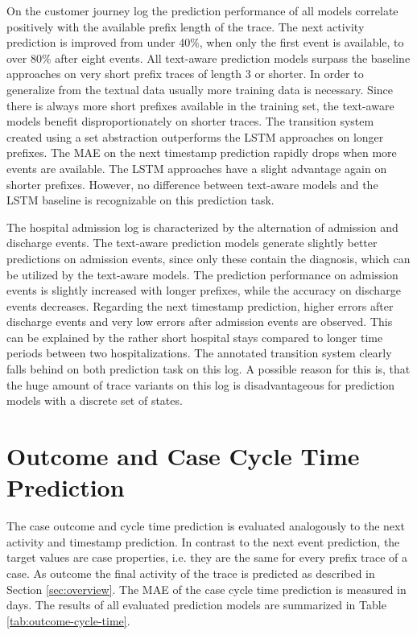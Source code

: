 On the customer journey log the prediction performance of all models correlate positively with the available prefix length of the trace.
The next activity prediction is improved from under 40\%, when only the first event is available, to over 80\% after eight events.
All text-aware prediction models surpass the baseline approaches on very short prefix traces of length 3 or shorter.
In order to generalize from the textual data usually more training data is necessary.
Since there is always more short prefixes available in the training set, the text-aware models benefit disproportionately on shorter traces.
The transition system created using a set abstraction outperforms the LSTM approaches on longer prefixes.
The MAE on the next timestamp prediction rapidly drops when more events are available.
The LSTM approaches have a slight advantage again on shorter prefixes.
However, no difference between text-aware models and the LSTM baseline is recognizable on this prediction task.

The hospital admission log is characterized by the alternation of admission and discharge events.
The text-aware prediction models generate slightly better predictions on admission events, since only these contain the diagnosis, which can be utilized by the text-aware models.
The prediction performance on admission events is slightly increased with longer prefixes, while the accuracy on discharge events decreases.
Regarding the next timestamp prediction, higher errors after discharge events and very low errors after admission events are observed.
This can be explained by the rather short hospital stays compared to longer time periods between two hospitalizations.
The annotated transition system clearly falls behind on both prediction task on this log.
A possible reason for this is, that the huge amount of trace variants on this log is disadvantageous for prediction models with a discrete set of states.


\section{Outcome and Case Cycle Time Prediction}

The case outcome and cycle time prediction is evaluated analogously to the next activity and timestamp prediction.
In contrast to the next event prediction, the target values are case properties, i.e. they are the same for every prefix trace of a case.
As outcome the final activity of the trace is predicted as described in Section \ref{sec:overview}.
The MAE of the case cycle time prediction is measured in days.
The results of all evaluated prediction models are summarized in Table \ref{tab:outcome-cycle-time}.


